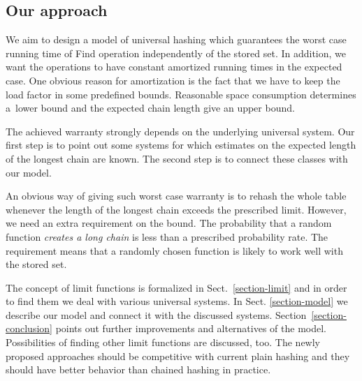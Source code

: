 \subsection{Our approach}
We aim to design a model of universal hashing which guarantees the worst case running time of Find operation independently of the stored set. In addition, we want the operations to have constant amortized running times in the expected case. One obvious reason for amortization is the fact that we have to keep the load factor in some predefined bounds. Reasonable space consumption determines a~lower bound and the expected chain length give an upper bound.

The achieved warranty strongly depends on the underlying universal system. Our first step is to point out some systems for which estimates on the expected length of the longest chain are known. The second step is to connect these classes with our model.

An obvious way of giving such worst case warranty is to rehash the whole table whenever the length of the longest chain exceeds the prescribed limit. However, we need an extra requirement on the bound. The probability that a random function \emph{creates a long chain} is less than a prescribed probability rate. The requirement means that a randomly chosen function is likely to work well with the stored set.

The concept of limit functions is formalized in Sect.~\ref{section-limit} and in order to find them we deal with various universal systems. In Sect. \ref{section-model} we describe our model and connect it with the discussed systems. Section~\ref{section-conclusion} points out further improvements and alternatives of the model. Possibilities of finding other limit functions are discussed, too. The newly proposed approaches should be competitive with current plain hashing and they should have better behavior than chained hashing in practice.
